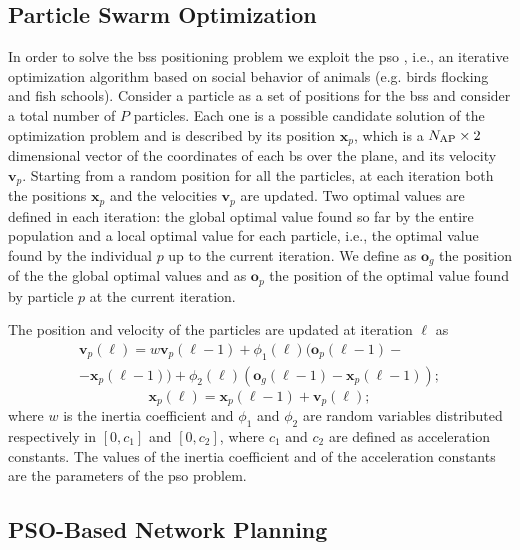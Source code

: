 \documentclass[conference]{IEEEtran}
\begin{document}
\subsection{Particle Swarm Optimization}
In order to solve the \acp{bs} positioning problem we exploit the \ac{pso} \cite{Kennedy-11}, i.e., an iterative optimization algorithm based on social behavior of animals (e.g. birds flocking and fish schools). Consider a particle as a set of positions for the \acp{bs} and consider a total number of $P$ particles. Each one is a possible candidate solution of the optimization problem and is described by its position $\bm{x}_p$, which is a $N_{\rm AP} \times 2$ dimensional vector of the coordinates of each \ac{bs} over the plane, and its velocity $\bm{v}_p$.
Starting from a random position for all the particles, at each iteration both the positions $\bm{x}_p$ and the velocities $\bm{v}_p$ are updated. Two optimal values are defined in each iteration: the global optimal value found so far by the entire population and a local optimal value for each particle, i.e., the optimal value found by the individual $p$ up to the current iteration. We define as $\bm{o}_g$ the position of the the global optimal values and as $\bm{o}_p$ the position of the optimal value found by particle $p$ at the current iteration.

The position and velocity of the particles are updated at iteration $\ell$ as
   \begin{equation}\label{eq: v up}
\begin{split}
  \bm{v}_p(\ell) = w\bm{v}_p(\ell-1)+\phi_1(\ell)(\bm{o}_p(\ell-1)-\\
  -\bm{x}_p(\ell-1))+\phi_2(\ell)(\bm{o}_g(\ell-1)-\bm{x}_p(\ell-1));
  \end{split}
  \end{equation}
  \begin{equation}\label{eq: p up}
  \bm{x}_p(\ell) = \bm{x}_p(\ell-1) + \bm{v}_p(\ell);
 \end{equation}
where $w$ is the inertia coefficient and $\phi_1$ and $\phi_2$ are random variables distributed respectively in $[0,c_1]$ and $[0,c_2]$, where $c_1$ and $c_2$ are defined as acceleration constants. The values of the inertia coefficient and of the acceleration constants are the parameters of the \ac{pso} problem.

\subsection{PSO-Based Network Planning}
\end{document}
